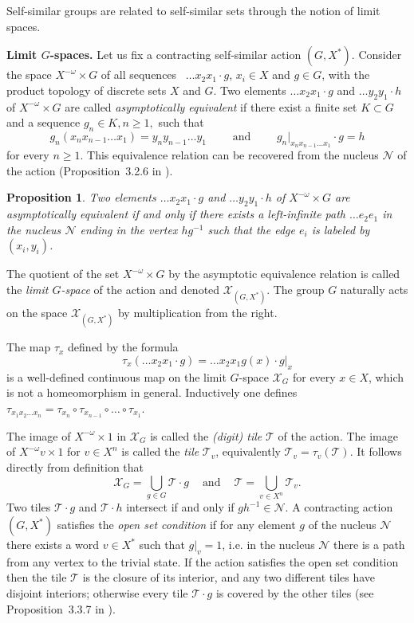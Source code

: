 \documentclass[12pt]{article}
\newcommand{\xmo}{X^{-\omega}}
\newcommand{\limGs}[1][G]{\mathcal{X}_{#1}}
\newcommand{\tile}{\mathscr{T}}
\newcommand{\nucl}{\mathcal{N}}
\newtheorem{prop}[theor]{Proposition}
\theoremstyle{definition}
\begin{document}
Self-similar groups are related to self-similar sets through the notion of limit spaces.

\textbf{Limit $G$-spaces.} Let us fix a contracting self-similar action $(G,X^{*})$. Consider the
space $\xmo\times G$ of all sequences \ $\ldots x_2x_1\cdot g$, $x_i\in X$ and $g\in G$, with the
product topology of discrete sets $X$ and $G$. Two elements $\ldots x_2x_1\cdot g$ and $\ldots
y_2y_1\cdot h$ of $\xmo\times G$ are called \textit{asymptotically equivalent} if there exist a
finite set $K\subset G$ and  a sequence $g_n\in K, n\geq 1,$ such that
\begin{displaymath}
g_n(x_n x_{n-1}\ldots x_1)=y_n y_{n-1}\ldots y_1\qquad \mbox{ and }\qquad g_n|_{x_n x_{n-1}\ldots
x_1}\cdot g=h
\end{displaymath}
for every $n\geq 1$. This equivalence relation can be recovered from the nucleus $\nucl$ of the
action (Proposition~3.2.6 in \cite{self_sim_groups}).


\begin{prop}\label{prop_asympt_Moore_diagr}
Two elements $\ldots x_2x_1\cdot g$ and $\ldots y_2y_1\cdot h$ of $\xmo\times G$ are asymptotically
equivalent if and only if there exists a left-infinite path $\ldots e_2e_1$ in the nucleus $\nucl$
ending in the vertex $hg^{-1}$ such that the edge $e_i$ is labeled by $(x_i,y_i)$.
\end{prop}

The quotient of the set $\xmo\times G$ by the asymptotic equivalence relation is called the
\textit{limit $G$-space} of the action and denoted $\limGs[(G,X^*)]$. The group $G$ naturally acts
on the space $\limGs[(G,X^*)]$ by multiplication from the right.


The map $\tau_x$ defined by the formula
\[
\tau_x(\ldots x_2 x_1\cdot g)=\ldots x_2 x_1 g(x)\cdot g|_x
\]
is a well-defined continuous map on the limit $G$-space $\limGs$ for every $x\in X$, which is not a
homeomorphism in general. Inductively one defines $\tau_{x_1x_2\ldots
x_n}=\tau_{x_n}\circ\tau_{x_{n-1}}\circ\ldots\circ\tau_{x_1}$.


The image of $\xmo\times 1$ in $\limGs$ is called the \textit{(digit) tile} $\tile$ of the action.
The image of $\xmo v\times 1$ for $v\in X^n$ is called the \textit{tile} $\tile_v$, equivalently
$\tile_v=\tau_v(\tile)$. It follows directly from definition that
\[
\limGs=\bigcup_{g\in G} \tile\cdot g \ \ \ \ \mbox{ and } \ \ \ \ \tile=\bigcup_{v\in X^n} \tile_v.
\]
Two tiles $\tile\cdot g$ and $\tile\cdot h$ intersect if and only if $gh^{-1}\in\nucl$. A
contracting action $(G,X^*)$ satisfies the \emph{open set condition} if for any element $g$ of the
nucleus $\nucl$ there exists a word $v\in X^*$ such that $g|_v=1$, i.e. in the nucleus $\nucl$
there is a path from any vertex to the trivial state. If the action satisfies the open set
condition then the tile $\tile$ is the closure of its interior, and any two different tiles have
disjoint interiors; otherwise every tile $\tile\cdot g$ is covered by the other tiles (see
Proposition~3.3.7 in \cite{self_sim_groups}).
\end{document}
